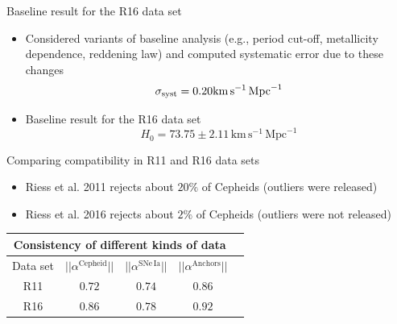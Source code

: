 \documentclass{beamer}
\newcommand{\Cepheid}{\mathrm{Cepheid}}
\newcommand{\Anchors}{\mathrm{Anchors}}
\newcommand{\SNe}{\mathrm{SNe\,Ia}}
\newcommand{\km}{\mathrm{km}}
\newcommand{\second}{\mathrm{s}}
\newcommand{\Mpc}{\mathrm{Mpc}}
\newcommand{\NGC}{\mathrm{NGC4258}}
\begin{document}

\begin{frame}{Baseline result for the R16 data set}
\begin{itemize}
\item[] Considered variants of baseline analysis (e.g., period cut-off, metallicity dependence, reddening law) and computed systematic error due to these changes 
\begin{equation*}
\sigma_{\rm syst}=0.20 \km\, \second^{-1}\, \Mpc^{-1} 
\end{equation*}
\item[] Baseline result for the R16 data set
\begin{equation*}
H_0 = 73.75 \pm 2.11\,\km\, \second^{-1}\, \Mpc^{-1}
\end{equation*}
\end{itemize}
\end{frame}

\begin{frame}{Comparing compatibility in R11 and R16 data sets}
\begin{itemize}
\item Riess et al. 2011 rejects about $20\%$ of Cepheids (outliers were released)
\item Riess et al. 2016 rejects about $2\%$ of Cepheids (outliers were not released)
\end{itemize}
\begin{table}[tbp]
\centering
\begin{tabular}{@{}ccccc}
\hline
\multicolumn{4}{c}{Consistency of different kinds of data} \\
\hline
Data set &$|| \alpha^{\Cepheid}||$ & $|| \alpha^{\SNe}||$ & $|| \alpha^{\Anchors}||$ \\
\hline
 R11 &  $ 0.72 $ & $ 0.74 $ & $0.86$  \\
 
 R16 &  $ 0.86 $ & $ 0.78 $ & $0.92$  \\
  

\hline
\end{tabular}
\end{table}
\end{frame}
\end{document}
